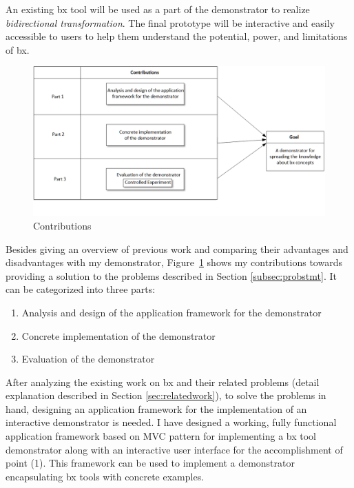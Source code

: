 An existing bx tool will be used as a part of the demonstrator to realize \textit{bidirectional transformation}. The final prototype will be interactive and easily accessible to users to help them understand the potential, power, and limitations of bx.

\begin{figure}[h]
	\centering
	\includegraphics[width=1\textwidth]{figures/Contribution}
	\caption{Contributions}
	\label{fig:Contribution}
\end{figure}

Besides giving an overview of previous work and comparing their advantages and disadvantages with my demonstrator, Figure~\ref{fig:Contribution} shows my contributions towards providing a solution to the problems described in Section \ref{subsec:probstmt}. It can be categorized into three parts: 

\begin{enumerate} 
	\item {Analysis and design of the application framework for the demonstrator} 
	\item {Concrete implementation of the demonstrator}
	\item {Evaluation of the demonstrator}
\end{enumerate}

After analyzing the existing work on bx and their related problems (detail explanation described in Section \ref{sec:relatedwork}), to solve the problems in hand, designing an application framework for the implementation of an interactive demonstrator is needed. I have designed a working, fully functional application framework based on MVC pattern for implementing a bx tool demonstrator along with an interactive user interface for the accomplishment of point (1). This framework can be used to implement a demonstrator encapsulating bx tools with concrete examples.

